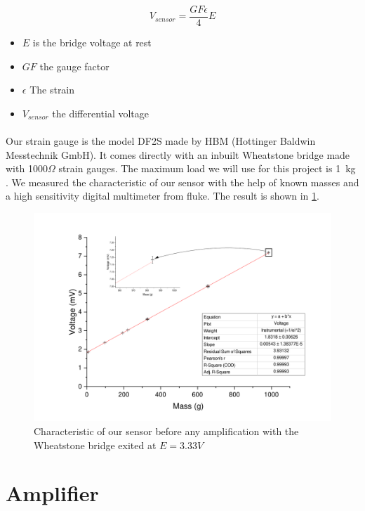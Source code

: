 \documentclass{article}[12pt]
\begin{document}
\begin{equation}
V_{sensor}=\dfrac{GF \epsilon}{4}E
\end{equation}
\begin{itemize}
\item $E$ is the bridge voltage at rest
\item $GF$ the gauge factor
\item $\epsilon$ The strain
\item $V_{sensor}$ the differential voltage
\end{itemize}
\paragraph{}
Our strain gauge is the model DF2S made by HBM (Hottinger Baldwin Messtechnik GmbH). It comes directly with an inbuilt Wheatstone bridge made with 1000$\Omega$ strain gauges. The maximum load we will use for this project is 1 kg \cite{HottingerBaldwinMesstechnikGmbH}. We measured the characteristic of our sensor with the help of known masses and a high sensitivity digital multimeter from fluke. The result is shown in \ref{fig:beforeamp}.
\begin{figure}[H]
	\centering
	\includegraphics[width=\textwidth]{figures/beforeamp.pdf}
	\caption{Characteristic of our sensor before any amplification with the Wheatstone bridge exited at $E=3.33V$}
	\label{fig:beforeamp}
\end{figure}

\section{Amplifier}
\end{document}
